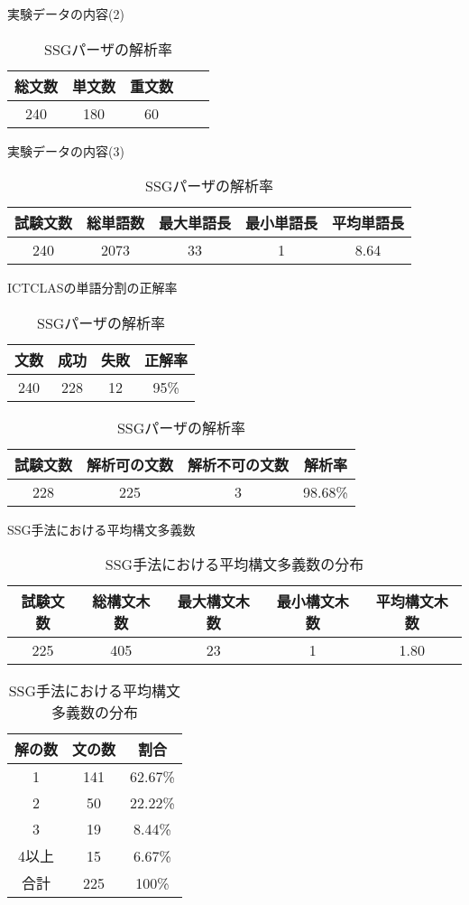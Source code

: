 \documentclass[japanese]{jnlp_1.3a}
\begin{document}
\begin{table}[t]\centering
\begin{minipage}{120pt}
  \caption{実験データの内容(2)}
  \begin{tabular}{|c|c|c|c|c|} \hline
総文数&単文数 & 重文数  \\\hline
240&180&60       \\\hline
  \end{tabular}
  \label{tab:data2}
\end{minipage}
\hfill
\begin{minipage}{270pt}
\centering
  \caption{実験データの内容(3)}
  \begin{tabular}{|c|c|c|c|c|} \hline
試験文数&総単語数 & 最大単語長 & 最小単語長 & 平均単語長  \\\hline
240&2073 & 33 &1  &        8.64       \\\hline
  \end{tabular}
  \label{tab:data3}
\end{minipage}
    \par\vspace{\baselineskip}
\begin{minipage}{160pt}
\centering
  \caption{ICTCLASの単語分割の正解率}
  \begin{tabular}{|c|c|c|c|} \hline
文数 & 成功 & 失敗 & 正解率\\\hline
240 & 228 & 12 & 95\%\\\hline
  \end{tabular}
  \label{tab:resict2}
\end{minipage}
\hfill
\begin{minipage}{230pt}
  \caption{SSGパーザの解析率}
  \begin{tabular}{|c|c|c|c|} \hline
試験文数 & 解析可の文数 & 解析不可の文数  & 解析率\\\hline
228 & 225 & 3 & 98.68\% \\\hline
  \end{tabular}
  \label{tab:resssg0}
\end{minipage}
\end{table}
\begin{table}[b]
\centering
  \caption{SSG手法における平均構文多義数}
  \begin{tabular}{|c|c|c|c|c|} \hline
試験文数&総構文木数 & 最大構文木数 & 最小構文木数 & 平均構文木数  \\\hline
225 & 405 &23  & 1  & 1.80           \\\hline
  \end{tabular}
  \label{tab:resssg1}
    \vspace{\baselineskip}
  \caption{SSG手法における平均構文多義数の分布}
  \begin{tabular}{|c|c|c|} \hline
解の数 & 文の数 & 割合\\\hline
1 & 141& 62.67\% \\
2 & 50 & 22.22\% \\
3 & 19 & 8.44\% \\
4以上 & 15 & 6.67\% \\\hline
合計 & 225 & 100\% \\\hline
  \end{tabular}
  \label{tab:resssg2}
\end{table}
\end{document}
